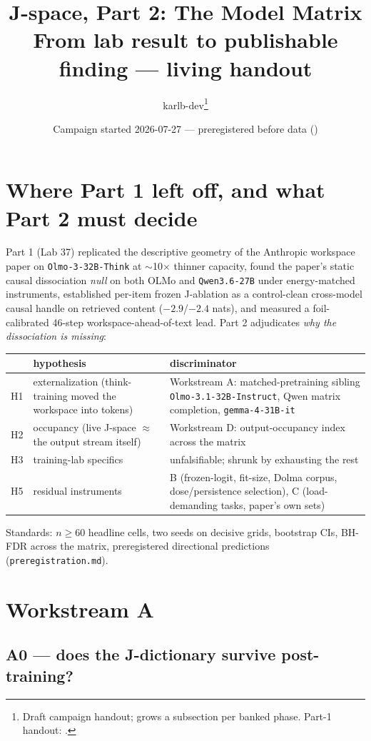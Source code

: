 \documentclass[10pt]{article}
\title{\textbf{J-space, Part 2: The Model Matrix}\\
\large From lab result to publishable finding --- living handout}
\author{karlb-dev\thanks{Draft campaign handout; grows a subsection per
banked phase. Part-1 handout: \code{jspace/handout/olmo32b\_jspace\_handout.pdf}.}}
\date{Campaign started 2026-07-27 --- preregistered before data (\code{27c6d3c})}
\newcommand{\code}[1]{\texttt{\small #1}}
\begin{document}
\maketitle

\section{Where Part 1 left off, and what Part 2 must decide}

Part 1 (Lab 37) replicated the descriptive geometry of the Anthropic
workspace paper on \code{Olmo-3-32B-Think} at $\sim$10$\times$ thinner
capacity, found the paper's static causal dissociation \emph{null} on both
OLMo and \code{Qwen3.6-27B} under energy-matched instruments, established
per-item frozen J-ablation as a control-clean cross-model causal handle on
retrieved content ($-2.9$/$-2.4$ nats), and measured a foil-calibrated
46-step workspace-ahead-of-text lead. Part 2 adjudicates \emph{why the
dissociation is missing}:

\begin{center}\small
\begin{tabular}{llp{7.6cm}}
\toprule
 & hypothesis & discriminator \\
\midrule
H1 & externalization (think-training moved the workspace into tokens) &
Workstream A: matched-pretraining sibling \code{Olmo-3.1-32B-Instruct},
Qwen matrix completion, \code{gemma-4-31B-it} \\
H2 & occupancy (live J-space $\approx$ the output stream itself) &
Workstream D: output-occupancy index across the matrix \\
H3 & training-lab specifics & unfalsifiable; shrunk by exhausting the rest \\
H5 & residual instruments & B (frozen-logit, fit-size, Dolma corpus,
dose/persistence selection), C (load-demanding tasks, paper's own sets) \\
\bottomrule
\end{tabular}
\end{center}

Standards: $n\ge60$ headline cells, two seeds on decisive grids, bootstrap
CIs, BH-FDR across the matrix, preregistered directional predictions
(\code{preregistration.md}).

\section{Workstream A}

\subsection{A0 --- does the J-dictionary survive post-training?}
\end{document}

